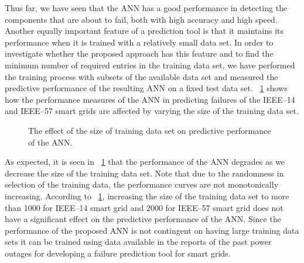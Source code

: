 \documentclass[12pt]{elsarticle}
\begin{document}
Thus far, we have seen that the ANN has a good performance in detecting the components that are about to fail, both with high accuracy and high speed. Another equally important feature of a prediction tool is that it maintains its performance when it is trained with a relatively small data set. In order to investigate whether the proposed approach has this feature and to find the minimum number of required entries in the training data set, we have performed the training process with subsets of the available data set and measured the predictive performance of the resulting ANN on a fixed test data set. \figurename~\ref{fig:nn_training_size} shows how the performance measures of the ANN in predicting failures of the IEEE--14 and IEEE--57 smart grids are affected by varying the size of the training data set.

\begin{figure}[!h]
\centering
{}

\caption{The effect of the size of training data set on predictive performance of the ANN.}
\label{fig:nn_training_size}
\end{figure}

As expected, it is seen in \figurename~\ref{fig:nn_training_size} that the performance of the ANN degrades as we decrease the size of the training data set. Note that due to the randomness in selection of the training data, the performance curves are not monotonically increasing. According to \figurename~\ref{fig:nn_training_size}, increasing the size of the training data set to more than 1000 for IEEE--14 smart grid and 2000 for IEEE--57 smart grid does not have a significant effect on the predictive performance of the ANN. Since the performance of the proposed ANN is not contingent on having large training data sets it can be trained using data available in the reports of the past power outages for developing a failure prediction tool for smart grids.
\end{document}
